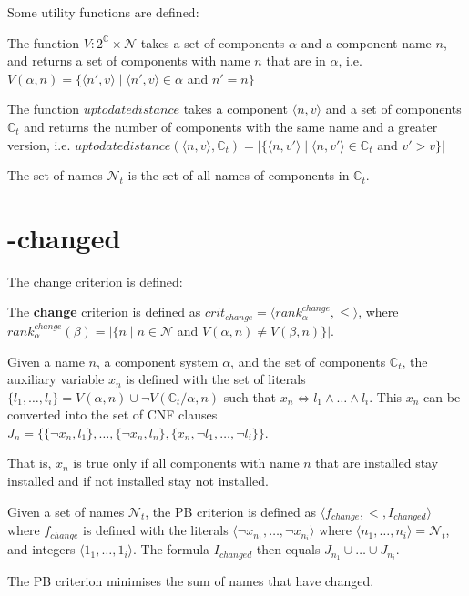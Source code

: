 Some utility functions are defined:

\begin{defs}
The function $V: 2^{\mathbb{C}} \times \mathcal{N}$ takes a set of components $\alpha$ and a component name $n$, and returns a set of components with name $n$ that are in $\alpha$,
i.e. $V(\alpha,n) = \{\langle n',v \rangle \mid \langle n',v \rangle \in \alpha $ and $ n' = n \}$
\end{defs}

\begin{defs}
The function $uptodatedistance$ takes a component $\langle n, v \rangle$ and a set of components $\mathbb{C}_t$ and returns the number of components with the same name and a greater version,
i.e. $uptodatedistance(\langle n, v \rangle,\mathbb{C}_t) = |\{\langle n, v' \rangle \mid \langle n, v' \rangle \in \mathbb{C}_t $ and $ v' > v \}|$
\end{defs}

\begin{defs}
The set of names $\mathcal{N}_t$ is the set of all names of components in $\mathbb{C}_t$.
\end{defs}

\section{-changed}

The change criterion is defined:
\begin{defs}
	The \textbf{change} criterion is defined as $crit_{change} = \langle rank^{change}_{\alpha}, \leq \rangle$,
	where $rank^{change}_{\alpha}(\beta) = |\{n \mid n \in \mathcal{N}$ and $V(\alpha,n) \neq V(\beta,n) \}|$.
\end{defs}

\begin{defs}
Given a name $n$, a component system $\alpha$, and the set of components $\mathbb{C}_t$,
the auxiliary variable $x_n$ is defined with the set of literals $\{l_1,\ldots,l_i\} = V(\alpha,n) \cup \neg V(\mathbb{C}_t / \alpha ,n)$ 
such that $x_n \Leftrightarrow l_1 \wedge \ldots \wedge l_i$.
This $x_n$ can be converted into the set of CNF clauses $J_n = \{ \{\neg x_n,l_1\},\ldots, \{\neg x_n,l_n\}, \{x_n, \neg l_1,\ldots,\neg l_i\}\}$.
\end{defs}
That is, $x_n$ is true only if all components with name $n$ that are installed stay installed and if not installed stay not installed.

\begin{defs}
Given a set of names $\mathcal{N}_t$, the PB criterion is defined as $\langle f_{change}, <, I_{changed} \rangle$ where 
$f_{change}$ is defined with the literals $\langle \neg x_{n_1},\ldots, \neg x_{n_i}\rangle$ where $\langle n_1,\ldots, n_i \rangle = \mathcal{N}_t$, and integers $\langle 1_1,\ldots,1_i\rangle$.
The formula $I_{changed}$ then equals $J_{n_1} \cup \ldots \cup J_{n_i}$.
\end{defs}
The PB criterion minimises the sum of names that have changed.

